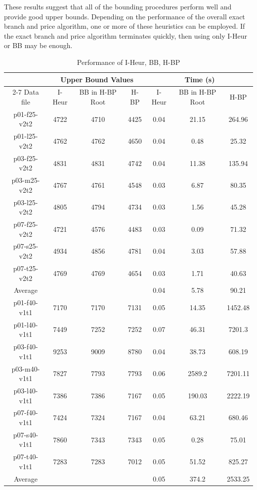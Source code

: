 These results suggest that all of the bounding procedures perform well and provide
good upper bounds. Depending on the performance of the overall exact branch and price
algorithm, one or more of these heuristics can be employed. If the exact branch and price
algorithm terminates quickly, then using only I-Heur or BB may be enough.
\begin{table}[!h]
\centering
\caption{Performance of I-Heur, BB, H-BP}\label{primal-heur-table1}
\begin {tabular}[!h]{|c|c|c|c|c|c|c|}
\hline
\mbox{} & \multicolumn{3}{|c|}{Upper Bound Values} & \multicolumn{3}{|c|}{Time (s)} \\\cline{2-7}
Data file & I-Heur & BB in H-BP Root & H-BP & I-Heur & BB in H-BP Root & H-BP \\\hline
p01-f25-v2t2 &  4722 &  4710    &   4425    & 0.04  &   21.15   &   264.96  \\
p01-l25-v2t2 &  4762 &  4762    &   4650    & 0.04  &   0.48    &   25.32   \\
p03-f25-v2t2 &  4831 &  4831    &   4742    & 0.04  &   11.38   &   135.94  \\
p03-m25-v2t2 &  4767 &  4761    &   4548    & 0.03  &   6.87    &   80.35   \\
p03-l25-v2t2 &  4805 &  4794    &   4734    & 0.03  &   1.56    &   45.28   \\
p07-f25-v2t2 &  4721 &  4576    &   4483    & 0.03  &   0.09    &   71.32   \\
p07-s25-v2t2 &  4934 &  4856    &   4781    & 0.04  &   3.03    &   57.88   \\
p07-t25-v2t2 &  4769 &  4769    &   4654    & 0.03  &   1.71    &   40.63   \\\hline
Average & \mbox{}&  \mbox{} &   \mbox{} & 0.04  &   5.78    &   90.21   \\\hline
p01-f40-v1t1 &  7170 &  7170    &   7131    & 0.05  &   14.35   &   1452.48 \\
p01-l40-v1t1 &  7449 &  7252    &   7252    & 0.07  &   46.31   &   7201.3  \\
p03-f40-v1t1 &  9253 &  9009    &   8780    & 0.04  &   38.73   &   608.19  \\
p03-m40-v1t1 &  7827 &  7793    &   7793    & 0.06  &   2589.2  &   7201.11 \\
p03-l40-v1t1 &  7386 &  7386    &   7167    & 0.05  &   190.03  &   2222.19 \\
p07-f40-v1t1 &  7424 &  7324    &   7167    & 0.04  &   63.21   &   680.46  \\
p07-s40-v1t1 &  7860 &  7343    &   7343    & 0.05  &   0.28    &   75.01   \\
p07-t40-v1t1 &  7283 &  7283    &   7012    & 0.05  &   51.52   &   825.27  \\\hline
Average & \mbox{}    &  \mbox{} &   \mbox{} & 0.05  &   374.2   &   2533.25 \\\hline
\end{tabular}
\end{table}

